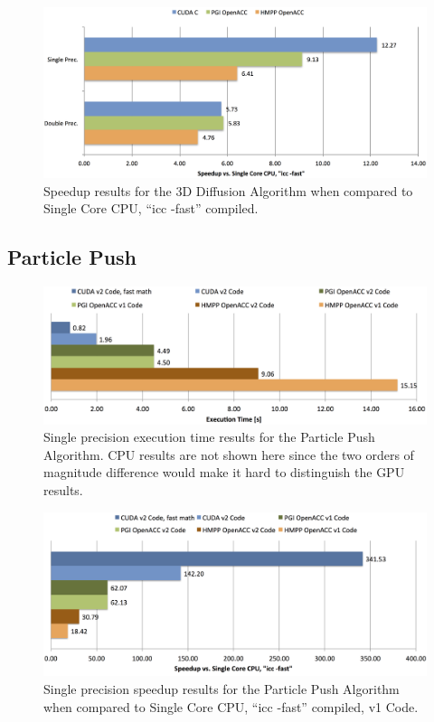 \begin{figure}[htpb]
	\centering
	\includegraphics[width=14cm]{figures/diffusionSpeedupResults}
	\caption[Speedup Results for 3D Diffusion]{Speedup results for the 3D Diffusion Algorithm when compared to Single Core CPU, ``icc -fast'' compiled.}
	\label{figure:diffusionSpeedup}
\end{figure}

\clearpage
\subsection{Particle Push} \label{sec:perfEvalParticle}

\begin{figure}[htpb]
        \centering
        \includegraphics[width=14cm]{figures/particleExecTimeResults}
        \caption[Execution Time Results for Particle Push]{Single precision execution time results for the Particle Push Algorithm. CPU results are not shown here since the two orders of magnitude difference would make it hard to distinguish the GPU results.}
        \label{figure:particleExecTime}
\end{figure}

\begin{figure}[htpb]
        \centering
        \includegraphics[width=14cm]{figures/particleSpeedupResults}
        \caption[Speedup Results for Particle Push]{Single precision speedup results for the Particle Push Algorithm when compared to Single Core CPU, ``icc -fast'' compiled, v1 Code.}
        \label{figure:particleSpeedup}
\end{figure}

